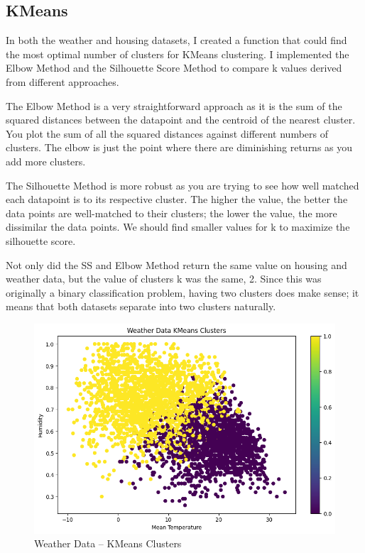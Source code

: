 \documentclass[conference]{IEEEtran}
\begin{document}
\subsection{KMeans}
In both the weather and housing datasets, I created a function that could find the most optimal number of clusters for KMeans clustering. I implemented the Elbow Method and the Silhouette Score Method to compare k values derived from different approaches. 
\par The Elbow Method is a very straightforward approach as it is the sum of the squared distances between the datapoint and the centroid of the nearest cluster. You plot the sum of all the squared distances against different numbers of clusters. The elbow is just the point where there are diminishing returns as you add more clusters. 
\par The Silhouette Method is more robust as you are trying to see how well matched each datapoint is to its respective cluster. The higher the value, the better the data points are well-matched to their clusters; the lower the value, the more dissimilar the data points. We should find smaller values for k to maximize the silhouette score. 
\par Not only did the SS and Elbow Method return the same value on housing and weather data, but the value of clusters k was the same, 2. Since this was originally a binary classification problem, having two clusters does make sense; it means that both datasets separate into two clusters naturally.
\begin{figure} 
    \centering
    \includegraphics[width=1.0\linewidth]{figures//weather_figures/step_1a.png}
    \caption{Weather Data -- KMeans Clusters}
    \label{fig:1_weather_kmeans
}
\end{figure}
\end{document}
